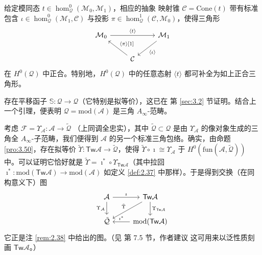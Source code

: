\begin{Lem}\label{lem:3.54}
给定模同态 $t\in\hom^0_{\mathcal Q}(\mathcal M_0,\mathcal M_1)$，相应的抽象
映射锥 $\mathcal C=\mathrm{Cone}(t)$ 带有标准包含
$\iota\in\hom^0_{\mathcal Q}(\mathcal M_1,\mathcal C)$ 与投影
$\pi\in\hom^1_{\mathcal Q}(\mathcal C,\mathcal M_0)$，使得三角形
\[
  \begin{tikzcd}
    \mathcal M_0 \arrow[rr, "{\langle t\rangle}"] & &
    \mathcal M_1 \arrow[dl, "{\langle\iota\rangle}"] \\
    & \mathcal C \arrow[ul, "{\langle\pi\rangle{[}1{]}}"'] &
  \end{tikzcd}
\]
在 $H^0(\mathcal Q)$ 中正合。特别地，$H^0(\mathcal Q)$ 中的任意态射
$\langle t\rangle$ 都可补全为如上正合三角形。
\end{Lem}

存在平移函子 $\mathbb S:\mathcal Q\to\mathcal Q$（它特别是拟等价），这已在
第 \ref{sec:3.2} 节证明。结合上一个引理，便表明
$\mathcal Q=\mathrm{mod}(\mathcal A)$ 是三角 $A_\infty$-范畴。

\begin{Rem}\label{rem:3.55}
考虑 $\mathcal F=\Upsilon_{\mathcal A}:\mathcal A\to\tilde{\mathcal Q}$
（上同调全忠实），其中 $\tilde{\mathcal Q}\subset\mathcal Q$ 是由
$\Upsilon_{\mathcal A}$ 的像对象生成的三角全 $A_\infty$-子范畴，我们便得到
$\mathcal A$ 的另一个标准三角包络。确实，由命题 \ref{pro:3.50}，存在拟等价
$\tilde\Upsilon:\mathsf{Tw}\mathcal A\to\tilde{\mathcal Q}$，使得
$\tilde\Upsilon\circ\imath\cong\Upsilon_{\mathcal A}$ 于
$H^0(\mathrm{fun}(\mathcal A,\tilde{\mathcal Q}))$ 中。可以证明它恰好就是
$\tilde\Upsilon=\imath^*\circ\Upsilon_{\mathsf{Tw}\mathcal A}$（其中拉回
$\imath^*:\mathrm{mod}(\mathsf{Tw}\mathcal A)\to\mathrm{mod}(\mathcal A)$
如定义 \ref{def:2.37} 中那样）。于是得到交换（在同构意义下）图
\[
  \begin{tikzcd}
    \mathcal A \arrow[r, "{\imath}"] \arrow[d, "{\Upsilon_{\mathcal A}}"']
    & \mathsf{Tw}\mathcal A \arrow[d, "{\Upsilon_{\mathsf{Tw}\mathcal A}}"]
    \arrow[dl, "{\tilde\Upsilon}"'] \\
    \tilde{\mathcal Q} & \mathrm{mod}(\mathsf{Tw}\mathcal A)
    \arrow[l, "{\imath^*}"']
  \end{tikzcd}
\]
它正是注 \ref{rem:2.38} 中给出的图。（见 \cite{Kel01} 第 7.5 节，作者建议
这可用来以泛性质刻画 $\mathsf{Tw}\mathcal A$。）
\end{Rem}
